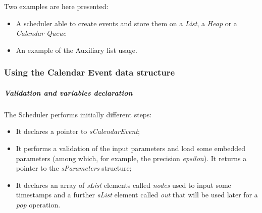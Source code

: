 Two examples are here presented:
\begin{itemize}
\item A scheduler able to create events and store them on a \textit{List}, a \textit{Heap} or a \textit{Calendar Queue}
\item An example of the Auxiliary list usage.
\end{itemize}

\subsubsection{Using the Calendar Event data structure }


\subparagraph{Validation and variables declaration}
The Scheduler performs initially different steps:
\begin{itemize}
\item It declares a pointer to \textit{sCalendarEvent};
\item It performs a validation of the input parameters and load some embedded parameters (among which, for example, the precision \textit{epsilon}). It returns a pointer to the \textit{sParameters} structure;
\item It declares an array of \textit{sList} elements called \textit{nodes} used to input some timestamps and a further \textit{sList} element called \textit{out} that will be used later for a \textit{pop} operation. 
\end{itemize}

